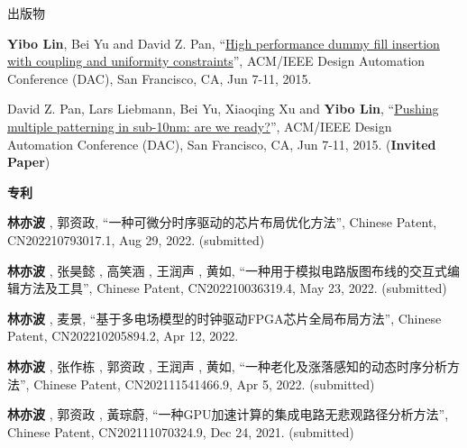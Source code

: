 \begin{rSection}{出版物}
\begin{description}[font=\normalfont, rightmargin=2em]
{}
            

\item[{[C2]}]{
        \textbf{Yibo Lin}, Bei Yu and David Z. Pan, 
    ``\href{http://dl.acm.org/citation.cfm?id=2744769.2744850}{High performance dummy fill insertion with coupling and uniformity constraints}'', 
    ACM/IEEE Design Automation Conference (DAC), San Francisco, CA, Jun 7-11, 2015.
    
}
            

\item[{[C1]}]{
        David Z. Pan, Lars Liebmann, Bei Yu, Xiaoqing Xu and \textbf{Yibo Lin}, 
    ``\href{http://dl.acm.org/citation.cfm?id=2744769.2747940}{Pushing multiple patterning in sub-10nm: are we ready?}'', 
    ACM/IEEE Design Automation Conference (DAC), San Francisco, CA, Jun 7-11, 2015.
    (\textbf{Invited Paper})
}
            

\end{description}
    

\textbf{专利}
        

\begin{description}[font=\normalfont, rightmargin=2em]
    

\item[{[P10]}]{
        \textbf{林亦波} ,  郭资政, 
    ``一种可微分时序驱动的芯片布局优化方法'', 
    Chinese Patent, CN202210793017.1, Aug 29, 2022.
    (submitted)
}
            

\item[{[P9]}]{
        \textbf{林亦波} ,  张昊懿 ,  高笑涵 ,  王润声 ,  黄如, 
    ``一种用于模拟电路版图布线的交互式编辑方法及工具'', 
    Chinese Patent, CN202210036319.4, May 23, 2022.
    (submitted)
}
            

\item[{[P8]}]{
        \textbf{林亦波} ,  麦景, 
    ``基于多电场模型的时钟驱动FPGA芯片全局布局方法'', 
    Chinese Patent, CN202210205894.2, Apr 12, 2022.
    
}
            

\item[{[P7]}]{
        \textbf{林亦波} ,  张作栋 ,  郭资政 ,  王润声 ,  黄如, 
    ``一种老化及涨落感知的动态时序分析方法'', 
    Chinese Patent, CN202111541466.9, Apr 5, 2022.
    (submitted)
}
            

\item[{[P6]}]{
        \textbf{林亦波} ,  郭资政 ,  黃琮蔚, 
    ``一种GPU加速计算的集成电路无悲观路径分析方法'', 
    Chinese Patent, CN202111070324.9, Dec 24, 2021.
    (submitted)
}
            


\end{description}
\end{rSection}

